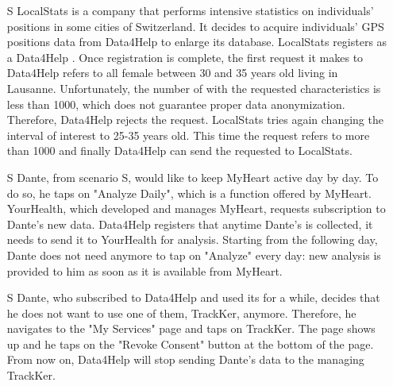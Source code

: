 \documentclass[../../rasd.tex]{subfiles}
\begin{document}
\begin{itemize}
                    \item[S\subs{4}] LocalStats is a company that performs intensive statistics on individuals' positions in some cities of Switzerland. It decides to acquire individuals' GPS positions data from Data4Help to enlarge its database. LocalStats registers as a Data4Help . Once registration is complete, the first request it makes to Data4Help refers to all female  between 30 and 35 years old living in Lausanne. Unfortunately, the number of  with the requested characteristics is less than 1000, which does not guarantee proper data anonymization. Therefore, Data4Help rejects the  request. LocalStats tries again changing the interval of interest to 25-35 years old. This time the request refers to more than 1000  and finally Data4Help can send the requested  to LocalStats.

                    \item[S\subs{5}] Dante, from scenario S, would like to keep MyHeart active day by day. To do so, he taps on "Analyze Daily", which is a function offered by MyHeart. YourHealth, which developed and manages MyHeart, requests subscription to Dante's new data. Data4Help registers that anytime Dante's  is collected, it needs to send it to YourHealth for analysis. Starting from the following day, Dante does not need anymore to tap on "Analyze" every day: new analysis is provided to him as soon as it is available from MyHeart.

                    \item[S\subs{6}] Dante, who subscribed to Data4Help and used its  for a while, decides that he does not want to use one of them, TrackKer, anymore. Therefore, he navigates to the "My Services" page and taps on TrackKer. The  page shows up and he taps on the "Revoke Consent" button at the bottom of the page. From now on, Data4Help will stop sending Dante's data to the  managing TrackKer.
                \end{itemize}
\end{document}
